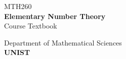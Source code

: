 \documentclass[11pt, a4paper, oneside]{book}
\begin{document}
\frontmatter
\begin{titlepage}
    \centering
    \vspace*{6cm}
    
    {\LARGE MTH260}
    \\[0.5cm]
    {\Huge\bfseries Elementary Number Theory}
    \\[1.5cm]
    {\LARGE Course Textbook}

    \vfill

    {\Large Department of Mathematical Sciences}
    \\[0.4cm]
    {\Large\bfseries UNIST}
\end{titlepage}

\clearpage
\thispagestyle{empty}

\begin{flushright}
\end{flushright}
\end{document}
